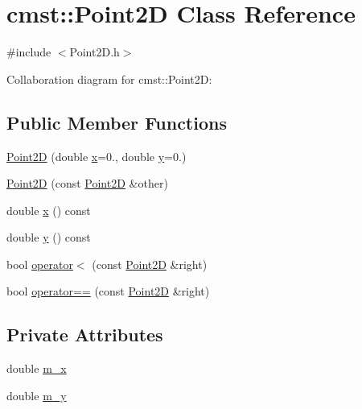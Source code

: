 \hypertarget{classcmst_1_1_point2_d}{}\section{cmst\+:\+:Point2D Class Reference}
\label{classcmst_1_1_point2_d}


{\ttfamily \#include $<$Point2\+D.\+h$>$}



Collaboration diagram for cmst\+:\+:Point2D\+:
\subsection*{Public Member Functions}
\begin{DoxyCompactItemize}
\item 
\hyperlink{classcmst_1_1_point2_d_a2291fb012502a29399852810b5a081a8}{Point2D} (double \hyperlink{classcmst_1_1_point2_d_a7745045ba529c4f2a2a0384974a42448}{x}=0., double \hyperlink{classcmst_1_1_point2_d_a15a4383f1c181b7c7518ccac6f578564}{y}=0.)
\item 
\hyperlink{classcmst_1_1_point2_d_a24e903416a709a44f844b93c7295ed67}{Point2D} (const \hyperlink{classcmst_1_1_point2_d}{Point2D} \&other)
\item 
double \hyperlink{classcmst_1_1_point2_d_a7745045ba529c4f2a2a0384974a42448}{x} () const 
\item 
double \hyperlink{classcmst_1_1_point2_d_a15a4383f1c181b7c7518ccac6f578564}{y} () const 
\item 
bool \hyperlink{classcmst_1_1_point2_d_a07c101f4fb6663aaa6c32de475a149fe}{operator$<$} (const \hyperlink{classcmst_1_1_point2_d}{Point2D} \&right)
\item 
bool \hyperlink{classcmst_1_1_point2_d_a9544f3c9e53240832f8323e75d75a042}{operator==} (const \hyperlink{classcmst_1_1_point2_d}{Point2D} \&right)
\end{DoxyCompactItemize}
\subsection*{Private Attributes}
\begin{DoxyCompactItemize}
\item 
double \hyperlink{classcmst_1_1_point2_d_ae531b08a2a67babee5b677b4b7e79ea9}{m\+\_\+x}
\item 
double \hyperlink{classcmst_1_1_point2_d_a24414f1e4970aa89c3d7137a9e7955a5}{m\+\_\+y}
\end{DoxyCompactItemize}
